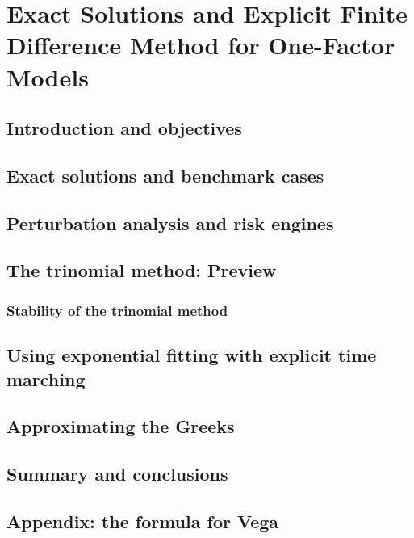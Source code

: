 \chapter{Exact Solutions and Explicit Finite Difference Method for One-Factor Models}

\section{Introduction and objectives}

\section{Exact solutions and benchmark cases}

\section{Perturbation analysis and risk engines}

\section{The trinomial method: Preview}

\subsection{Stability of the trinomial method}

\section{Using exponential fitting with explicit time marching}

\section{Approximating the Greeks}

\section{Summary and conclusions}

\section{Appendix: the formula for Vega}